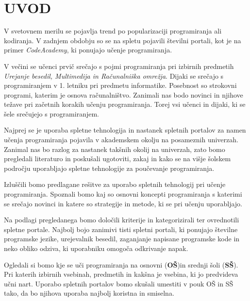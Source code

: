 \section{UVOD}
\label{sec:Uvod}


V svetovnem merilu se pojavlja trend po popularizaciji programiranja
ali kodiranja. V zadnjem obdobju so se na spletu pojavili številni
portali, kot je na primer \emph{CodeAcademy}, ki ponujajo učenje
programiranja. %



V večini se učenci prvič srečajo s pojmi programiranja pri izbirnih
predmetih \emph{Urejanje besedil, Multimedija in Računalniška
  omrežja}. Dijaki se srečajo s programiranjem v 1. letniku pri
predmetu informatike. Posebnost so strokovni programi, katerim je
osnova računalništvo. Zanimali nas bodo novinci in njihove težave pri
začetnih korakih učenju programiranja. Torej vsi učenci in dijaki, ki
se šele srečujejo s programiranjem.

Najprej se je uporaba spletne tehnologija in nastanek spletnih
portalov za namen učenja programiranja pojavila v akademskem okolju na
posameznih univerzah. Zanimal nas bo razlog za nastanek takšnih okolij
na univerzah, zato bomo pregledali literaturo in poskušali ugotoviti,
zakaj in kako se na višje šolskem področju uporabljajo spletne
tehnologije za poučevanje programiranja.

Izluščili bomo predlagane rešitve za uporabo spletnih tehnologij pri
učenje programiranja. Spoznali bomo kaj so osnovni koncepti
programiranja s katerimi se srečajo novinci in katere so strategije in
metode, ki se pri učenju uporabljajo.

Na podlagi pregledanega bomo določili kriterije in kategorizirali ter
ovrednotili spletne portale. Najbolj bojo zanimivi tisti
spletni portali, ki ponujajo številne programske jezike, urejevalnik
besedil, zaganjanje napisane programske kode in neko obliko odziva, ki
uporabniku omogoča odkrivanje napak.


Ogledali si bomo kje se uči programiranja na osnovni (\textbf{OŠ})in
srednji šoli (\textbf{SŠ}). Pri katerih izbirnih vsebinah, predmetih
in kakšna je vsebina, ki jo predvideva učni nart. Uporabo spletnih
portalov bomo skušali umestiti v pouk OŠ in SŠ tako, da bo njihova
uporaba najbolj koristna in smiselna.


